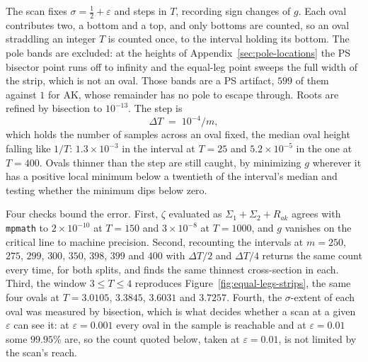 \documentclass[11pt]{article}
\theoremstyle{definition}
\begin{document}
The scan fixes $\sigma=\tfrac12+\varepsilon$ and steps in $T$, recording sign
changes of $g$. Each oval contributes two, a bottom and a top, and only bottoms
are counted, so an oval straddling an integer $T$ is counted once, to the interval
holding its bottom. The pole bands are excluded: at the heights of
Appendix~\ref{sec:pole-locations} the PS bisector point runs off to infinity and the
equal-leg point sweeps the full width of the strip, which is not an oval. Those
bands are a PS artifact, $599$ of them against $1$ for AK, whose remainder has
no pole to escape through. Roots are refined by bisection to $10^{-13}$. The
step is
\begin{equation}\label{eq:oval-step}
\Delta T\;=\;10^{-4}/m ,
\end{equation}
which holds the number of samples across an oval fixed, the median oval height
falling like $1/T$: $1.3\times10^{-3}$ in the interval at $T=25$ and
$5.2\times10^{-5}$ in the one at $T=400$. Ovals thinner than the step are still caught, by minimizing $g$
wherever it has a positive local minimum below a twentieth of the interval's
median and testing whether the minimum dips below zero.

Four checks bound the error. First, $\zeta$ evaluated as $\Sigma_1+\Sigma_2+R_{ak}$
agrees with \texttt{mpmath} to $2\times10^{-10}$ at $T=150$ and
$3\times10^{-8}$ at $T=1000$, and $g$ vanishes on the critical line to machine
precision. Second, recounting the intervals at $m=250$, $275$, $299$, $300$, $350$, $398$,
$399$ and $400$ with $\Delta T/2$ and $\Delta T/4$ returns the same count every
time, for both splits, and finds the same thinnest cross-section in each. Third, the window $3\le T\le4$ reproduces
Figure~\ref{fig:equal-legs-strips}, the same four ovals at $T=3.0105$,
$3.3845$, $3.6031$ and $3.7257$. Fourth, the $\sigma$-extent of each oval was
measured by bisection, which is what decides whether a scan at a given
$\varepsilon$ can see it: at $\varepsilon=0.001$ every oval in the sample is
reachable and at $\varepsilon=0.01$ some $99.95\%$ are, so the count quoted
below, taken at $\varepsilon=0.01$, is not limited by the scan's reach.
\end{document}

